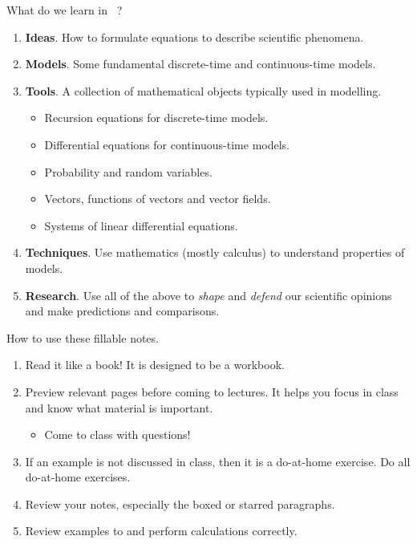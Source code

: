 \documentclass[../main.tex]{subfiles}
\begin{document}
What do we learn in \thecoursesubject~\thecoursenumb?

\begin{enumerate}
  \item \textbf{Ideas}. How to formulate equations to describe scientific phenomena.

  \item \textbf{Models}. Some fundamental discrete-time and continuous-time models.

  \item \textbf{Tools}. A collection of mathematical objects typically used in modelling.
    \begin{itemize}
      \item Recursion equations for discrete-time models.
      \item Differential equations for continuous-time models.
      \item Probability and random variables.
      \item Vectors, functions of vectors and vector fields.
      \item Systems of linear differential equations.
    \end{itemize}

  \item \textbf{Techniques}. Use mathematics (mostly calculus) to understand properties of models.

  \item \textbf{Research}. Use all of the above to \emph{shape} and \emph{defend} our scientific opinions and make predictions and comparisons.
\end{enumerate}

\bigskip{}
How to use these fillable notes.
\begin{enumerate}
  \item Read it like a book! It is designed to be a workbook.
  \item Preview relevant pages before coming to lectures. It helps you focus in class and know what material is important. 
    \begin{itemize}
      \item Come to class with questions!
    \end{itemize}
  \item If an example is not discussed in class, then it is a do-at-home exercise. Do all do-at-home exercises.
  \item Review your notes, especially the boxed or starred paragraphs.
  \item Review examples to  and perform calculations correctly.
\end{enumerate}
\end{document}
